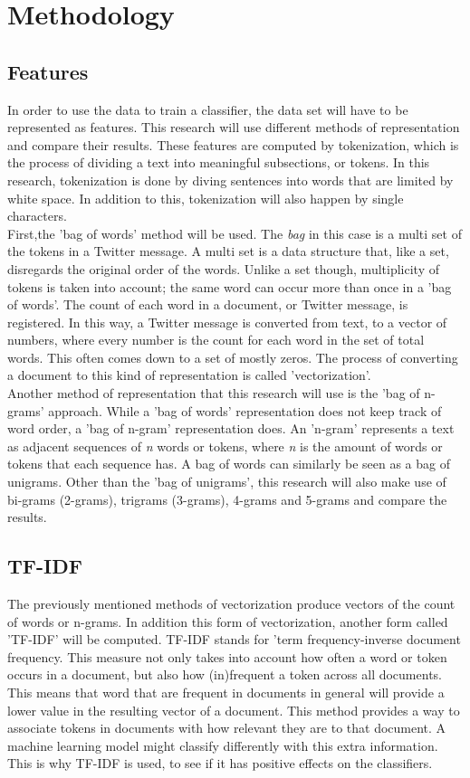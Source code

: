 \documentclass[
10pt, %
a4paper, %
oneside, %
headinclude,footinclude, %
] {book}%
\begin{document}
\chapter{Methodology}

\section{Features}
In order to use the data to train a classifier, the data set will have to be represented as features. This research will use different methods of representation and compare their results. These features are computed by tokenization, which is the process of dividing a text into meaningful subsections, or tokens. In this research, tokenization is done by diving sentences into words that are limited by white space. In addition to this, tokenization will also happen by single characters.\\
First,the 'bag of words' method will be used. The \emph{bag} in this case is a multi set of the tokens in a Twitter message. A multi set is a data structure that, like a set, disregards the original order of the words. Unlike a set though, multiplicity of tokens is taken into account; the same word can occur more than once in a 'bag of words'. The count of each word in a document, or Twitter message, is registered. In this way, a Twitter message is converted from text, to a vector of numbers, where every number is the count for each word in the set of total words. This often comes down to a set of mostly zeros. The process of converting a document to this kind of representation is called 'vectorization'.\\

Another method of representation that this research will use is the 'bag of n-grams' approach. While a 'bag of words' representation does not keep track of word order, a 'bag of n-gram' representation does. An 'n-gram' represents a text as adjacent sequences of \emph{n} words or tokens, where \emph{n} is the amount of words or tokens that each sequence has. A bag of words can similarly be seen as a bag of unigrams. Other than the 'bag of unigrams', this research will also make use of bi-grams (2-grams), trigrams (3-grams), 4-grams and 5-grams and compare the results. \\

\section{TF-IDF}
The previously mentioned methods of vectorization produce vectors of the count of words or n-grams. In addition this form of vectorization, another form called 'TF-IDF' will be computed. TF-IDF stands for 'term frequency-inverse document frequency. This measure not only takes into account how often a word or token occurs in a document, but also how (in)frequent a token across all documents. This means that word that are frequent in documents in general will provide a lower value in the resulting vector of a document. This method provides a way to associate tokens in documents with how relevant they are to that document. A machine learning model might classify differently with this extra information. This is why TF-IDF is used, to see if it has positive effects on the classifiers.
\end{document}

